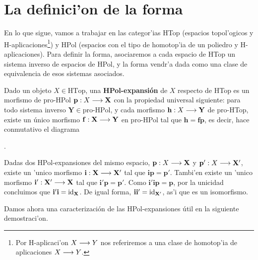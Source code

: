 \section{La definici'on de la forma} 
 En lo que sigue, vamos a trabajar en las categor'ias HTop (espacios topol'ogicos y H-aplicaciones\footnote{Por H-aplicaci'on $X\longrightarrow Y $ nos referiremos a una clase de homotop'ia de aplicaciones $X\longrightarrow Y$.}) y HPol (espacios con el tipo de homotop'ia de un poliedro y H-aplicaciones). Para definir la forma, asociaremos a cada espacio de HTop un sistema inverso de espacios de HPol, y la forma vendr'a dada como una clase de equivalencia de esos sistemas asociados.

 

\begin{definition}
  Dado un objeto $ X\in \text{HTop} $, una \textbf{HPol-expansión} de $ X  $ respecto de HTop es un morfismo de pro-HPol $ \mathbf{p }:X\longrightarrow \mathbf{X}  $ con la propiedad universal siguiente: para todo sistema inverso $ \mathbf{Y}\in \text{pro-HPol}$, y cada morfismo $ \mathbf{h }:X\longrightarrow \mathbf{Y} $ de pro-HTop, existe un único morfismo $ \mathbf{f }:\mathbf{X}\longrightarrow \mathbf{Y}  $ en pro-HPol tal que $ \mathbf{h } = \mathbf{f } \mathbf{p} $, es decir, hace conmutativo el diagrama 
  \begin{center}
    .
  \end{center}
\end{definition}
\begin{observation}
    Dadas dos HPol-expansiones del mismo espacio, $ \mathbf{p}:X\longrightarrow \mathbf{X} $ y $ \mathbf{p'}:X\longrightarrow \mathbf{X'} $, existe un 'unico morfismo $ \mathbf{i}:\mathbf{X}\longrightarrow \mathbf{X}' $ tal que $ \mathbf{i}\mathbf{p} = \mathbf{p}' $. Tambi'en existe un 'unico morfismo $ \mathbf{i'}:\mathbf{X}'\longrightarrow \mathbf{X}  $ tal que $ \mathbf{i'}\mathbf{p} = \mathbf{p}' $. Como $ \mathbf{i'}\mathbf{i }\mathbf{p} = \mathbf{p} $, por la unicidad concluimos que $ \mathbf{i' }\mathbf{i } = \operatorname{id}_{\mathbf{X}} $. De igual forma, $ \mathbf{i}\mathbf{i'} = \operatorname{id}_{\mathbf{X}' } $, as'i que es un isomorfismo.
\end{observation}
Damos ahora una caracterización de las HPol-expansiones útil en la siguiente demostraci'on.

